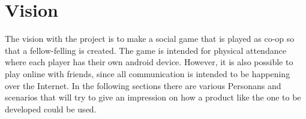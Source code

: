 \section{Vision}
	The vision with the project is to make a social game that is played as co-op so that a fellow-felling is created.  The game is intended for physical attendance where each player has their own android device. However, it is also possible to play online with friends, since all communication is intended to be happening over the Internet. In the following sections there are various Personans and scenarios that will try to give an impression on how a product like the one to be developed could be used.